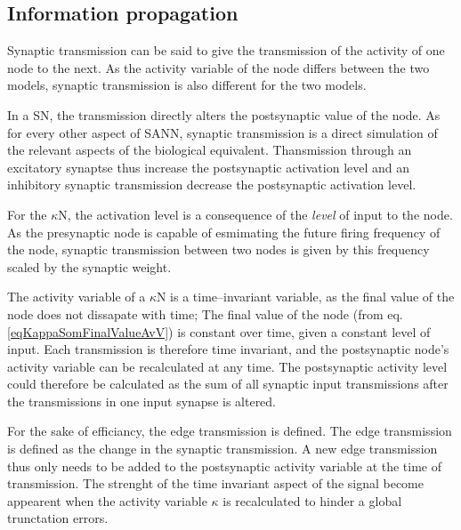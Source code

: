 	\subsection{Information propagation}
	Synaptic transmission can be said to give the transmission of the activity of one node to the next.
	As the activity variable of the node differs between the two models, synaptic transmission is also different for the two models.

	In a SN, the transmission directly alters the postsynaptic value of the node.
	As for every other aspect of SANN, synaptic transmission is a direct simulation of the relevant aspects of the biological equivalent.
	Thansmission through an excitatory synaptse thus increase the postsynaptic activation level and an inhibitory synaptic transmission decrease the postsynaptic activation level.

	For the $\kappa$N, the activation level is a consequence of the \emph{level} of input to the node.
	As the presynaptic node is capable of esmimating the future firing frequency of the node, synaptic transmission between two nodes is given by this frequency scaled by the synaptic weight.

	The activity variable of a $\kappa$N is a time--invariant variable, as the final value of the node does not dissapate with time;
		The final value of the node (from eq. \ref{eqKappaSomFinalValueAvV}) is constant over time, given a constant level of input.
	Each transmission is therefore time invariant, and the postsynaptic node's activity variable can be recalculated at any time.
	The postsynaptic activity level could therefore be calculated as the sum of all synaptic input transmissions after the transmissions in one input synapse is altered.

	For the sake of efficiancy, the edge transmission is defined.
	The edge transmission is defined as the change in the synaptic transmission.
	A new edge transmission thus only needs to be added to the postsynaptic activity variable at the time of transmission.
	The strenght of the time invariant aspect of the signal become appearent when the activity variable $\kappa$ is recalculated to hinder a global trunctation errors.




